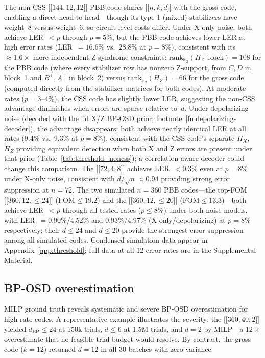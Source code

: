 \documentclass[aps,prxquantum,twocolumn,superscriptaddress,nofootinbib]{revtex4-2}
\newcommand{\FF}{\ensuremath{\mathbb{F}}}
\newcommand{\dblbrk}[1]{\ensuremath{\lbrack\!\lbrack #1 \rbrack\!\rbrack}}
\newcommand{\code}[1]{\dblbrk{#1}}
\newcommand{\FOM}{\ensuremath{\mathrm{FOM}}}
\begin{document}
The non-CSS $\code{144,12,12}$ PBB code shares $\code{n,k,d}$ with the gross code, enabling a direct head-to-head---though its type-1 (mixed) stabilizers have weight~8 versus weight~6, so circuit-level costs differ.%
Under X-only noise, both achieve LER~$< p$ through $p = 5\%$, but the PBB code achieves lower LER at high error rates (LER~$= 16.6\%$ vs.\ $28.8\%$ at $p = 8\%$), consistent with its $\approx 1.6\times$ more independent Z-syndrome constraints: $\mathrm{rank}_{\FF_2}(H_Z\text{-block}) = 108$ for the PBB code (where every stabilizer row has nonzero Z-support, from $C, D$ in block~1 and $B^\top, A^\top$ in block~2) versus $\mathrm{rank}_{\FF_2}(H_Z) = 66$ for the gross code (computed directly from the stabilizer matrices for both codes).
At moderate rates ($p = 3$--$4\%$), the CSS code has slightly lower LER, suggesting the non-CSS advantage diminishes when errors are sparse relative to~$d$.
Under depolarizing noise (decoded with the iid X/Z BP-OSD prior; footnote~\ref{fn:depolarizing-decoder}), the advantage disappears: both achieve nearly identical LER at all rates (9.4\% vs.\ 9.3\% at $p = 8\%$), consistent with the CSS code's separate $H_X$, $H_Z$ providing equivalent detection when both X and Z errors are present under that prior (Table~\ref{tab:threshold_noncss}); a correlation-aware decoder could change this comparison.
The $\code{72,4,8}$ achieves LER~$< 0.3\%$ even at $p = 8\%$ under X-only noise, consistent with $d/\sqrt{n} \approx 0.94$ providing strong error suppression at $n = 72$.
The two simulated $n = 360$ PBB codes---the top-FOM $\code{360,12,{\leq}24}$ ($\FOM \leq 19.2$) and the $\code{360,12,{\leq}20}$ ($\FOM \leq 13.3$)---both achieve LER~$< p$ through all tested rates ($p \leq 8\%$) under both noise models, with LER~$= 0.90\%$/$4.52\%$ and $0.93\%$/$4.97\%$ (X-only/depolarizing) at $p = 8\%$ respectively; their $d \leq 24$ and $d \leq 20$ provide the strongest error suppression among all simulated codes.
Condensed simulation data appear in Appendix~\ref{app:threshold}; full data at all 12 error rates are in the Supplemental Material.

\subsection{BP-OSD overestimation}
\label{sec:bposd_findings}

MILP ground truth reveals systematic and severe BP-OSD overestimation for high-rate codes.
A representative example illustrates the severity: the $\code{360,40,2}$ yielded $d_{\text{BP}} \leq 24$ at 150k trials, $d \leq 6$ at 1.5M trials, and $d = 2$ by MILP---a $12\times$ overestimate that no feasible trial budget would resolve.
By contrast, the gross code ($k = 12$) returned $d = 12$ in all 30 batches with zero variance.
\end{document}

